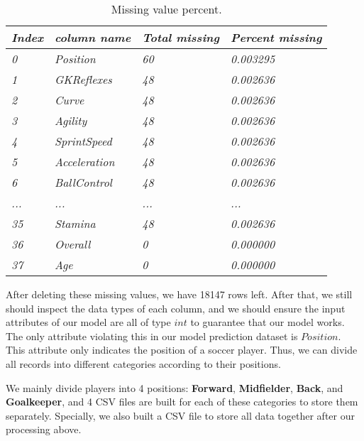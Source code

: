 \documentclass{article}
\begin{document}
\begin{table}[]
\centering
\begin{tabular}{|l|l|l|l|}
\hline
\textit{Index} & \textit{column name}          & \textit{Total missing} & \textit{Percent missing} \\ \hline
\textit{0}     & \textit{Position}             & \textit{60}            & \textit{0.003295}        \\ \hline
\textit{1}     & \textit{GKReflexes}           & \textit{48}            & \textit{0.002636}        \\ \hline
\textit{2}     & \textit{Curve}                & \textit{48}            & \textit{0.002636}        \\ \hline
\textit{3}     & \textit{Agility}              & \textit{48}            & \textit{0.002636}        \\ \hline
\textit{4}     & \textit{SprintSpeed}          & \textit{48}            & \textit{0.002636}        \\ \hline
\textit{5}     & \textit{Acceleration}         & \textit{48}            & \textit{0.002636}        \\ \hline
\textit{6}     & \textit{BallControl}          & \textit{48}            & \textit{0.002636}        \\ \hline
\textit{...}   & \textit{...}                  & \textit{...}           & \textit{...}             \\ \hline
\textit{35}    & \textit{Stamina}              & \textit{48}            & \textit{0.002636}        \\ \hline
\textit{36}    & \textit{Overall}              & \textit{0}             & \textit{0.000000}        \\ \hline
\textit{37}    & \textit{Age}                  & \textit{0}             & \textit{0.000000}        \\ \hline
\end{tabular}
\caption{Missing value percent.}
\end{table}

\par After deleting these missing values, we have 18147 rows left. After that, we still should inspect the data types of each column, and we should ensure the input attributes of our model are all of type $int$ to guarantee that our model works. The only attribute violating this in our model prediction dataset is $Position$. This attribute only indicates the position of a soccer player. Thus, we can divide all records into different categories according to their positions.
\par We mainly divide players into 4 positions: \textbf{Forward}, \textbf{Midfielder}, \textbf{Back}, and \textbf{Goalkeeper}, and 4 CSV files are built for each of these categories to store them separately. Specially, we also built a CSV file to store all data together after our processing above.
\end{document}
